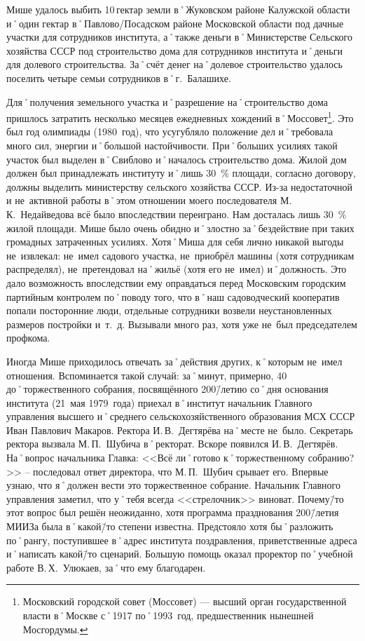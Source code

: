 Мише удалось выбить 10\,гектар земли в˚Жуковском районе Калужской области и˚один гектар в˚Павлово\-/Посадском районе Московской области под дачные участки для сотрудников института, а˚также деньги в˚Министерстве Сельского хозяйства СССР под строительство дома для сотрудников института и˚деньги для долевого строительства. За˚счёт денег на˚долевое строительство удалось поселить четыре семьи сотрудников в˚г.~Балашихе.

Для˚получения земельного участка и˚разрешение на˚строительство дома пришлось затратить несколько месяцев ежедневных хождений в˚Моссовет\footnote{Московский городской совет (Моссовет) — высший орган государственной власти в˚Москве с˚1917 по˚1993~год, предшественник нынешней Мосгордумы.}. Это был год олимпиады (1980~год), что усугубляло положение дел и˚требовала много сил, энергии и˚большой настойчивости. При˚больших усилиях такой участок был выделен в˚Свиблово и˚началось строительство дома. Жилой дом должен был принадлежать институту и˚лишь 30~\% площади, согласно договору, должны выделить министерству сельского хозяйства СССР. Из-за недостаточной и не~активной работы в˚этом отношении моего последователя М.\,К.~Недайведова всё было впоследствии переиграно. Нам досталась лишь 30~\% жилой площади. Мише было очень обидно и˚злостно за˚бездействие при таких громадных затраченных усилиях. Хотя˚Миша для себя лично никакой выгоды не~извлекал: не~имел садового участка, не~приобрёл машины (хотя сотрудникам распределял), не~претендовал на˚жильё (хотя его не~имел) и˚должность. Это дало возможность впоследствии ему оправдаться перед Московским городским партийным контролем по˚поводу того, что в˚наш садоводческий кооператив попали посторонние люди, отдельные сотрудники возвели неустановленных размеров постройки и~т.~д. Вызывали много раз, хотя уже не~был председателем профкома.

Иногда Мише приходилось отвечать за˚действия других, к˚которым не~имел отношения. Вспоминается такой случай: за˚минут, примерно, 40 до˚торжественного собрания, посвящённого 200\=/летию со˚дня основания института (21~мая 1979~года) приехал в˚институт начальник Главного управления высшего и˚среднего сельскохозяйственного образования МСХ СССР Иван Павлович Макаров. Ректора И.\,В.~Дегтярёва на˚месте не~было. Секретарь ректора вызвала М.\,П.~Шубича в˚ректорат. Вскоре появился И.\,В.~Дегтярёв. На˚вопрос начальника Главка: <<Всё ли˚готово к˚торжественному собранию?>> \--- последовал ответ директора, что М.\,П.~Шубич срывает его. Впервые узнаю, что я˚должен вести это торжественное собрание. Начальник Главного управления заметил, что у˚тебя всегда <<стрелочник>> виноват. Почему\=/то этот вопрос был решён неожиданно, хотя программа празднования 200\=/летия МИИЗа была в˚какой\=/то степени известна. Предстояло хотя бы˚разложить по˚рангу, поступившее в˚адрес института поздравления, приветственные адреса и˚написать какой\=/то сценарий. Большую помощь оказал проректор по˚учебной работе В.\,Х.~Улюкаев, за˚что ему благодарен.

